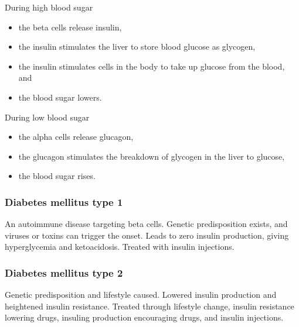During high blood sugar
\begin{itemize}
  \item the beta cells release insulin,
  \item the insulin stimulates the liver to store blood glucose as glycogen,
  \item the insulin stimulates cells in the body to take up glucose from the blood, and
  \item the blood sugar lowers.
\end{itemize}
During low blood sugar
\begin{itemize}
  \item the alpha cells release glucagon,
  \item the glucagon stimulates the breakdown of glycogen in the liver to glucose,
  \item the blood sugar rises.
\end{itemize}

\subsubsection{Diabetes mellitus type 1}
An autoimmune disease targeting beta cells. Genetic predisposition exists, and viruses or toxins can trigger the onset. Leads to zero insulin production, giving hyperglycemia and ketoacidosis. Treated with insulin injections.

\subsubsection{Diabetes mellitus type 2}
Genetic predisposition and lifestyle caused. Lowered insulin production and heightened insulin resistance. Treated through lifestyle change, insulin resistance lowering drugs, insuling production encouraging drugs, and insulin injections.
